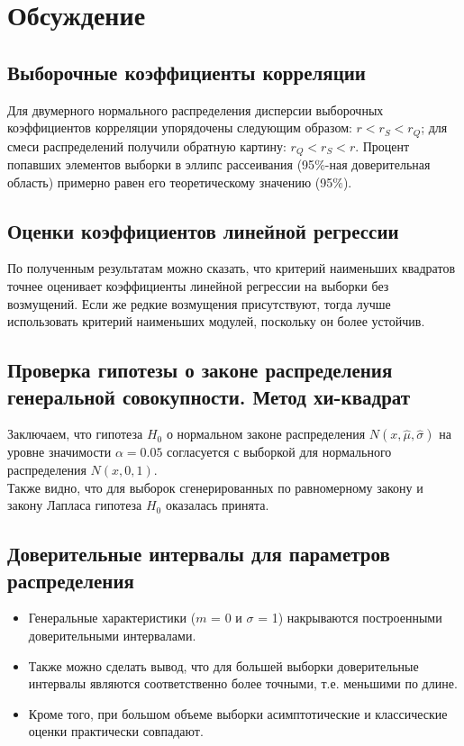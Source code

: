 \documentclass[a4paper,14pt]{article}
\begin{document}
	\section{Обсуждение}
	\subsection{Выборочные коэффициенты корреляции}
	\noindent Для двумерного нормального распределения дисперсии выборочных коэффициентов корреляции упорядочены следующим образом: $r < r_{S} < r_{Q}$; для смеси распределений получили обратную картину: $r_{Q} < r_{S} < r$.
	\newline
	\noindent Процент попавших элементов выборки в эллипс рассеивания (95$\%$-ная доверительная область) примерно равен его теоретическому значению (95$\%$).
	
	\subsection{Оценки коэффициентов линейной регрессии}
	\noindent По полученным результатам можно сказать, что критерий наименьших квадратов точнее оценивает коэффициенты линейной регрессии на выборки без возмущений. Если же редкие возмущения присутствуют, тогда лучше использовать критерий наименьших модулей, поскольку он более устойчив.
	
	\subsection{Проверка гипотезы о законе распределения генеральной совокупности. Метод хи-квадрат}
	
	\noindent Заключаем, что гипотеза $H_{0}$ о нормальном законе распределения $N(x,\hat{\mu}, \hat{\sigma})$ на уровне значимости $\alpha = 0.05$ согласуется с выборкой для нормального распределения $N(x, 0, 1)$.
	\\
	Также видно, что для выборок сгенерированных по равномерному закону и закону Лапласа гипотеза $H_{0}$ оказалась принята.
	
	 \subsection{Доверительные интервалы для параметров распределения}
	\begin{itemize}
		\item Генеральные характеристики ($m$ = 0 и $\sigma$ = 1) накрываются построенными доверительными интервалами. 
		\item Также можно сделать вывод, что для большей выборки доверительные интервалы являются соответственно более точными, т.е. меньшими по длине. 
		\item Кроме того, при большом объеме выборки асимптотические и классические оценки практически совпадают.
	\end{itemize}
	
\end{document}
